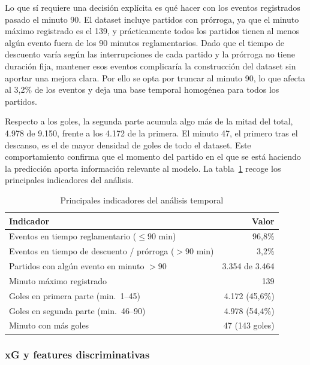 Lo que sí requiere una decisión explícita es qué hacer con los eventos registrados pasado el minuto 90. El dataset incluye partidos con prórroga, ya que el minuto máximo registrado es el 139, y prácticamente todos los partidos tienen al menos algún evento fuera de los 90 minutos reglamentarios. Dado que el tiempo de descuento varía según las interrupciones de cada partido y la prórroga no tiene duración fija, mantener esos eventos complicaría la construcción del dataset sin aportar una mejora clara. Por ello se opta por truncar al minuto 90, lo que afecta al 3,2\% de los eventos y deja una base temporal homogénea para todos los partidos.

Respecto a los goles, la segunda parte acumula algo más de la mitad del total, 4.978 de 9.150, frente a los 4.172 de la primera. El minuto 47, el primero tras el descanso, es el de mayor densidad de goles de todo el dataset. Este comportamiento confirma que el momento del partido en el que se está haciendo la predicción aporta información relevante al modelo. La tabla~\ref{tab:temporal} recoge los principales indicadores del análisis.

\begin{table}[H]
    \centering
    \begin{tabular}{lr}
        \hline
        \textbf{Indicador}                                     & \textbf{Valor} \\
        \hline
        Eventos en tiempo reglamentario ($\leq 90$ min)        & 96,8\%         \\
        Eventos en tiempo de descuento / prórroga ($> 90$ min) & 3,2\%          \\
        Partidos con algún evento en minuto $> 90$             & 3.354 de 3.464 \\
        Minuto máximo registrado                               & 139            \\
        \hline
        Goles en primera parte (min.\ 1--45)                   & 4.172 (45,6\%) \\
        Goles en segunda parte (min.\ 46--90)                  & 4.978 (54,4\%) \\
        Minuto con más goles                                   & 47 (143 goles) \\
        \hline
    \end{tabular}
    \caption{Principales indicadores del análisis temporal}
    \label{tab:temporal}
\end{table}

\subsubsection{xG y features discriminativas}

